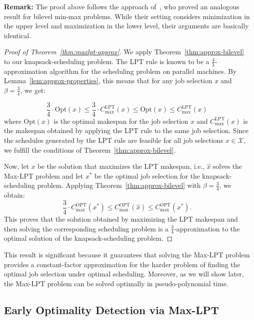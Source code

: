 \textbf{Remark:} The proof above follows the approach of~\cite{weninger2025bilevel}, who proved an analogous result for bilevel min-max problems. While their setting considers minimization in the upper level and maximization in the lower level, their arguments are basically identical.
\begin{proof}[Proof of Theorem~\ref{thm:maxlpt-approx}]
We apply Theorem~\ref{thm:approx-bilevel} to our knapsack-scheduling problem. The LPT rule is known to be a $\frac{4}{3}$-approximation algorithm for the scheduling problem on parallel machines. 
By Lemma~\ref{lem:approx-properties}, this means that for any job selection $x$ and $\beta = \frac{3}{4}$, we get:

\[
\frac{3}{4} \cdot \mathrm{Opt}({x}) \le \frac{3}{4} \cdot C_{\max}^{\text{LPT}}({x}) \le \mathrm{Opt}({x}) \le C_{\max}^{\text{LPT}}({x})
\]
where $\mathrm{Opt}({x})$ is the optimal makespan for the job selection $x$ and $C_{\max}^{\text{LPT}}({x})$ is the makespan obtained by applying the LPT rule to the same job selection.
Since the schedules generated by the LPT rule are feasible for all job selections $x \in \mathcal{X}$, we fulfill the conditions of Theorem~\ref{thm:approx-bilevel}.

Now, let $\hat{x}$ be the solution that maximizes the LPT makespan, i.e., $\hat{x}$ solves the Max-LPT problem and let $x^*$ be the optimal job selection for the knapsack-scheduling problem. Applying Theorem~\ref{thm:approx-bilevel} with $\beta = \frac{3}{4}$, we obtain:
\begin{equation*}
\frac{3}{4} \cdot C_{\max}^{\text{OPT}}({x^*}) \leq C_{\max}^{\text{OPT}}(\hat{x}) \leq C_{\max}^{\text{OPT}}({x^*}).
\end{equation*}
This proves that the solution obtained by maximizing the LPT makespan and then solving the corresponding scheduling problem is a $\frac{3}{4}$-approximation to the optimal solution of the knapsack-scheduling problem.
\end{proof}

This result is significant because it guarantees that solving the Max-LPT problem provides a constant-factor approximation for the harder problem of finding the optimal job selection under optimal scheduling. Moreover, as we will show later, the Max-LPT problem can be solved optimally in pseudo-polynomial time.

\subsection{Early Optimality Detection via Max-LPT}
\label{sec:early-optimality-detection}

